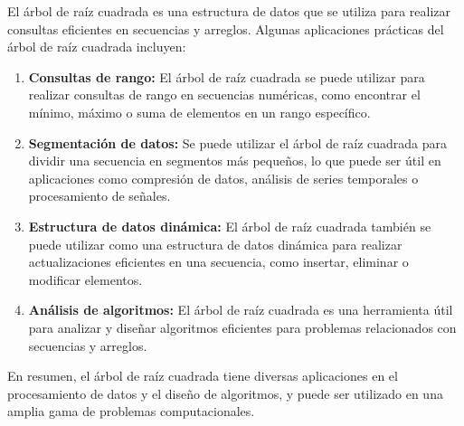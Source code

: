 El árbol de raíz cuadrada es una estructura de datos que se utiliza para realizar consultas eficientes en secuencias y arreglos. Algunas aplicaciones prácticas del árbol de raíz cuadrada incluyen:

\begin{enumerate}
	\item \textbf{Consultas de rango:} El árbol de raíz cuadrada se puede utilizar para realizar consultas de rango en secuencias numéricas, como encontrar el mínimo, máximo o suma de elementos en un rango específico.
	\item \textbf{Segmentación de datos:} Se puede utilizar el árbol de raíz cuadrada para dividir una secuencia en segmentos más pequeños, lo que puede ser útil en aplicaciones como compresión de datos, análisis de series temporales o procesamiento de señales.
	\item \textbf{Estructura de datos dinámica:} El árbol de raíz cuadrada también se puede utilizar como una estructura de datos dinámica para realizar actualizaciones eficientes en una secuencia, como insertar, eliminar o modificar elementos.
	\item \textbf{ Análisis de algoritmos:}  El árbol de raíz cuadrada es una herramienta útil para analizar y diseñar algoritmos eficientes para problemas relacionados con secuencias y arreglos.
\end{enumerate}

En resumen, el árbol de raíz cuadrada tiene diversas aplicaciones en el procesamiento de datos y el diseño de algoritmos, y puede ser utilizado en una amplia gama de problemas computacionales.